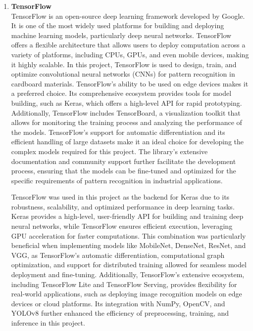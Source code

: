 \begin{enumerate}
    \item \textbf{TensorFlow} \\
	TensorFlow is an open-source deep learning framework developed by Google. It is one of the most widely used platforms for building and deploying machine learning models, particularly deep neural networks. TensorFlow offers a flexible architecture that allows users to deploy computation across a variety of platforms, including CPUs, GPUs, and even mobile devices, making it highly scalable.
	In this project, TensorFlow is used to design, train, and optimize convolutional neural networks (CNNs) for pattern recognition in cardboard materials. TensorFlow's ability to be used on edge devices  makes it a preferred choice. Its comprehensive ecosystem provides tools for model building, such as Keras, which offers a high-level API for rapid prototyping. Additionally, TensorFlow includes TensorBoard, a visualization toolkit that allows for monitoring the training process and analyzing the performance of the models.
	TensorFlow's support for automatic differentiation and its efficient handling of large datasets make it an ideal choice for developing the complex models required for this project. The library's extensive documentation and community support further facilitate the development process, ensuring that the models can be fine-tuned and optimized for the specific requirements of pattern recognition in industrial applications.
	
	TensorFlow was used in this project as the backend for Keras due to its robustness, scalability, and optimized performance in deep learning tasks. Keras provides a high-level, user-friendly API for building and training deep neural networks, while TensorFlow ensures efficient execution, leveraging GPU acceleration for faster computations. This combination was particularly beneficial when implementing models like MobileNet, DenseNet, ResNet, and VGG, as TensorFlow's automatic differentiation, computational graph optimization, and support for distributed training allowed for seamless model deployment and fine-tuning. Additionally, TensorFlow's extensive ecosystem, including TensorFlow Lite and TensorFlow Serving, provides flexibility for real-world applications, such as deploying image recognition models on edge devices or cloud platforms. Its integration with NumPy, OpenCV, and YOLOv8 further enhanced the efficiency of preprocessing, training, and inference in this project.
	

\end{enumerate}
